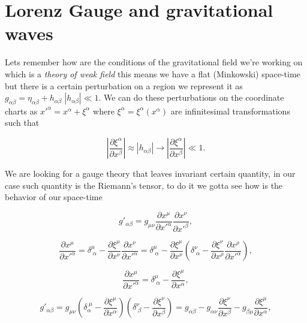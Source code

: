 \section{Lorenz Gauge and gravitational waves}

    Lets remember how are the conditions of the gravitational field we're working on which is a \textit{theory of weak field} this means we have a flat (Minkowski) space-time but there is a certain perturbation on a region we represent it as $g_{\alpha\beta} = \eta_{\alpha\beta} + h_{\alpha\beta}\;|h_{\alpha\beta}| \ll 1 $. We can do these perturbations on the coordinate charts as $x'^{\alpha} =x^{\alpha} + \xi^{\alpha} $ where $\xi^{\alpha}=\xi^{\alpha}(x^{\alpha}) $ are infinitesimal transformations such that

    \begin{equation}
        \left|\frac{\partial \xi^{\alpha}}{\partial x^{\beta}} \right| \approx |h_{\alpha\beta}| \rightarrow \left|\frac{\partial \xi^{\alpha}}{\partial x^{\beta}} \right| \ll 1.
    \end{equation}

    We are looking for a gauge theory that leaves invariant certain quantity, in our case such quantity is the Riemann's tensor, to do it we gotta see how is the behavior of our space-time

    \begin{equation}
        g'_{\alpha\beta}=g_{\mu\nu}\frac{\partial x^{\mu}}{\partial x'^{\alpha}}\frac{\partial x^{\nu}}{\partial x'^{\beta}},
    \end{equation}

    \begin{equation}
        \frac{\partial x^{\mu}}{\partial x'^{\alpha}} = \delta^{\mu}_{\;\alpha} - \frac{\partial \xi^{\mu}}{\partial x^{\nu}}\frac{\partial x^{\nu}}{\partial x'^{\alpha}} = \delta^{\mu}_{\;\alpha}-\frac{\partial \xi^{\mu}}{\partial x^{\nu}}\left(\delta^{\nu}_{\;\alpha}-\frac{\partial \xi^{\nu}}{\partial x^{\rho}}\frac{\partial x^{\rho}}{\partial x'^{\alpha}} \right),
    \end{equation}

    \begin{equation}\label{eq:deMuaPrimaAlpha}
        \frac{\partial x^{\mu}}{\partial x'^{\alpha}} = \delta^{\mu}_{\;\alpha}-\frac{\partial \xi^{\mu}}{\partial x^{\alpha}},
    \end{equation}

    \begin{equation}
        g'_{\alpha\beta} = g_{\mu\nu}\left(\delta_{\alpha}^{\;\mu} - \frac{\partial \xi^{\mu}}{\partial x^{\alpha}} \right)\left(\delta^{\nu}_{\;\beta} - \frac{\partial \xi^{\nu}}{\partial x^{\beta}} \right) = g_{\alpha\beta} - g_{\alpha\nu}\frac{\partial \xi^{\nu}}{\partial x^{\beta}} - g_{\beta\mu}\frac{\partial \xi^{\mu}}{\partial x^{\alpha}},
    \end{equation}

